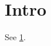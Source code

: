 \documentclass{article}
\begin{document}
\section{Intro}\label{sec:intro}
See \ref{sec:intro}.

\end{document}
